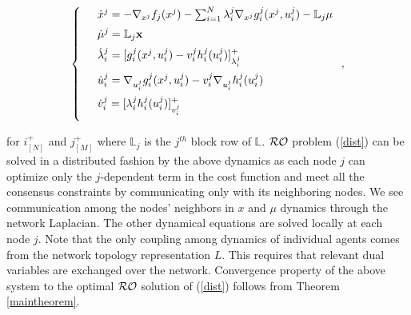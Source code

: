 \documentclass[journal,twoside,web]{ieeecolor}
\begin{document}
\begin{align}
\label{distributed_dynamics}
\left\{
\begin{array}{cl}
\vspace{2mm}
&\dot{x}^j=-\nabla_{x^{j}}f_{j}(x^{j})- \sum_{i=1}^N \lambda_i^j \nabla_{x^j}g_i^j(x^j,u_i^j)-{\mathbb{L}_j}\mu\\
\vspace{2mm}
&\dot{\mu}^j={\mathbb{L}_j}\mathbf{x}\\
\vspace{2mm}
&{\dot {\lambda}_i^j}=[g_i^j(x^j,u_i^j)-v_i^j h_i^j(u_i^j)]^+_{\lambda_i^j}\\
\vspace{2mm}
&{\dot {u}_i^j}=\nabla_{u_i^j}g_i^j(x^j,u_i^j)- 
v_i^j \nabla_{u_i^j} h_i^j(u_i^j)\\
\vspace{2mm}
&{\dot {v}_i^j}=[\lambda_i^j h_i^j(u_i^j)]^+_{v_i^j}
\end{array}
\right.,
\end{align}

for $i^+_{[N]}$ and $j^+_{[M]}$ where ${\mathbb{L}_j}$ is the $j^{th}$ block row of ${\mathbb{L}}$. ${\cal RO}$ problem (\ref{dist}) can be solved in a distributed fashion by the above dynamics as each node $j$ can optimize only the $j$-dependent term in the cost function and meet all the consensus constraints by communicating only with its neighboring nodes. We see communication among the nodes' neighbors in $x$ and $\mu$ dynamics through the network Laplacian. The other dynamical equations are solved locally at each node $j$. Note that the only coupling among dynamics of individual agents comes from the network topology representation $L$. This requires that relevant dual variables are exchanged over the network. Convergence property of the above system to the optimal ${\cal RO}$ solution of (\ref{dist}) follows from Theorem \ref{maintheorem}.
\fi

\end{document}
